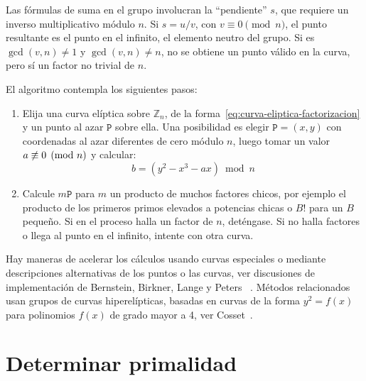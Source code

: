   Las fórmulas de suma en el grupo
  involucran la ``pendiente'' \(s\),
  que requiere un inverso multiplicativo módulo \(n\).
  Si \(s = u / v\),
  con \(v \equiv 0 \pmod{n}\),
  el punto resultante es el punto en el infinito,
  el elemento neutro del grupo.%
  Si es \(\gcd(v, n) \ne 1\) y \(\gcd(v, n) \ne n\),
  no se obtiene un punto válido en la curva,
  pero sí un factor no trivial de \(n\).

  El algoritmo contempla los siguientes pasos:
  \begin{enumerate}
  \item
    Elija una curva elíptica sobre \(\mathbb{Z}_n\),
    de la forma~\ref{eq:curva-eliptica-factorizacion}
    y un punto al azar \(\mathtt{P}\) sobre ella.
    Una posibilidad es elegir \(\mathtt{P} = (x, y)\)
    con coordenadas al azar diferentes de cero módulo \(n\),
    luego tomar un valor \(a \centernot\equiv 0 \pmod{n}\)
    y calcular:
    \begin{equation*}
      b = (y^2 - x^3 - a x) \bmod n
    \end{equation*}
  \item
    Calcule \(m \mathtt{P}\) para \(m\)
    un producto de muchos factores chicos,
    por ejemplo el producto de los primeros primos
    elevados a potencias chicas
    o \(B!\) para un \(B\) pequeño.
    Si en el proceso halla un factor de \(n\),
    deténgase.
    Si no halla factores o llega al punto en el infinito,
    intente con otra curva.
  \end{enumerate}

  Hay maneras de acelerar los cálculos usando curvas especiales
  o mediante descripciones alternativas de los puntos o las curvas,
  ver discusiones de implementación
  de Bernstein, Birkner, Lange y Peters~%
    \cite{cryptoeprint:2008:016}.
  Métodos relacionados usan grupos de curvas hiperelípticas,
  basadas en curvas de la forma \(y^2 = f(x)\)
  para polinomios \(f(x)\) de grado mayor a 4,
  ver Cosset~\cite{cosset10:_factor_genus_2_curves}.

\section{Determinar primalidad}
\label{sec:primalidad}

